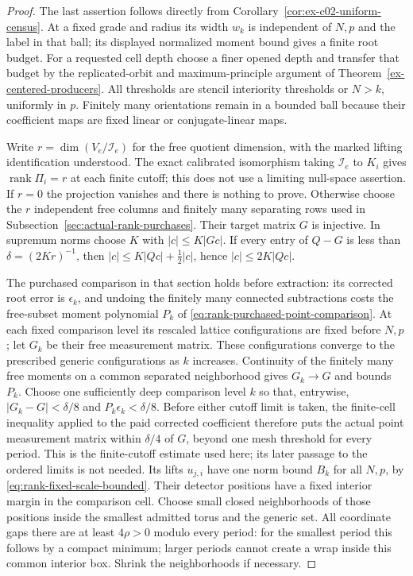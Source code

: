 \begin{proof}
The last assertion follows directly from
Corollary~\ref{cor:ex-c02-uniform-census}. At a fixed grade and radius
its width $w_k$ is independent of $N,p$ and the label in that ball;
its displayed normalized moment bound gives a finite root budget.
For a requested cell depth choose a finer opened depth and transfer
that budget by the replicated-orbit and maximum-principle argument of
Theorem~\ref{ex-centered-producers}. All thresholds are stencil
interiority thresholds or $N>k$, uniformly in $p$. Finitely many
orientations remain in a bounded ball because their coefficient maps
are fixed linear or conjugate-linear maps.

Write $r=\dim(V_e/\mathcal I_e)$ for the free quotient dimension,
with the marked lifting identification understood. The exact calibrated
isomorphism taking $\mathcal I_e$ to $K_i$ gives
$\operatorname{rank}\Pi_i=r$ at each finite cutoff; this does not use a
limiting null-space assertion. If $r=0$ the projection vanishes and
there is nothing to prove. Otherwise choose the $r$ independent free
columns and finitely many separating rows used in
Subsection~\ref{sec:actual-rank-purchases}. Their target matrix $G$ is
injective. In supremum norms choose $K$ with $|c|\le K|Gc|$.
If every entry of $Q-G$ is less than $\delta=(2Kr)^{-1}$, then
$|c|\le K|Qc|+\tfrac12|c|$, hence $|c|\le2K|Qc|$.

The purchased comparison in that section holds before extraction:
its corrected root error is $\epsilon_k$, and undoing the finitely
many connected subtractions costs the free-subset moment polynomial
$P_k$ of \eqref{eq:rank-purchased-point-comparison}. At each fixed
comparison level its rescaled lattice configurations are fixed before
$N,p$; let $G_k$ be their free measurement matrix. These configurations
converge to the prescribed generic configurations as $k$ increases.
Continuity of the finitely many free moments on a common separated
neighborhood gives $G_k\to G$ and bounds $P_k$. Choose one sufficiently
deep comparison level $k$ so that, entrywise,
$|G_k-G|<\delta/8$ and $P_k\epsilon_k<\delta/8$.
Before either cutoff limit is taken, the finite-cell inequality applied
to the paid corrected coefficient therefore puts the actual point
measurement matrix within $\delta/4$ of $G$, beyond one mesh threshold
for every period. This is the finite-cutoff estimate used here; its
later passage to the ordered limits is not needed. Its lifts $u_{j,i}$ have
one norm bound $B_k$ for all $N,p$, by
\eqref{eq:rank-fixed-scale-bounded}. Their detector positions have a
fixed interior margin in the comparison cell. Choose small closed
neighborhoods of those positions inside the smallest admitted torus
and the generic set. All coordinate gaps there are at least $4\rho>0$
modulo every period: for the smallest period this follows by a compact
minimum; larger periods cannot create a wrap inside this common
interior box. Shrink the neighborhoods if necessary.


\end{proof}
